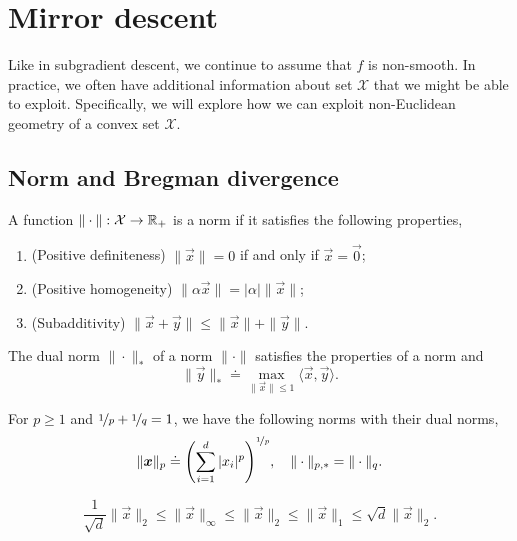 \section{Mirror descent}

Like in subgradient descent, we continue to assume that $f$ is non-smooth. In practice, we often
have additional information about set $\mathcal{X}$ that we might be able to exploit. Specifically,
we will explore how we can exploit non-Euclidean geometry of a convex set
$\mathcal{X}$.

\subsection{Norm and Bregman divergence}

\begin{definition}[Norm]
    A function $\| \cdot \|: \mathcal{X} \to \mathbb{R}_+$ is a norm if it satisfies the following properties,
    \begin{enumerate}
        \item (Positive definiteness) $\| \vec{x} \| = 0$ if and only if $\vec{x} = \vec{0}$;
        \item (Positive homogeneity) $\| \alpha \vec{x} \| = |\alpha| \| \vec{x} \|$;
        \item (Subadditivity) $\| \vec{x} + \vec{y} \| \leq \| \vec{x} \| + \| \vec{y} \|$.
    \end{enumerate}
\end{definition}

\begin{definition}
    The dual norm $\| \cdot \|_*$ of a norm $\| \cdot \|$ satisfies the properties of a norm and \[
        \| \vec{y} \|_* \doteq \max_{\| \vec{x} \| \leq 1} \langle \vec{x}, \vec{y} \rangle.
    \]
\end{definition}

\begin{lemma}
    For $p \geq 1$ and $\nicefrac{1}{p} + \nicefrac{1}{q} = 1$, we have the following norms with their dual norms, \[
        \| \vec{x} \|_p \doteq \lft( \sum_{i=1}^{d} |x_i|^p \rgt)^{\nicefrac{1}{p}}, \quad \| \cdot \|_{p,*} = \| \cdot \|_q.
    \]
\end{lemma}

\begin{lemma}
    \[
        \frac{1}{\sqrt{d}} \| \vec{x} \|_2 \leq \| \vec{x} \|_\infty \leq \| \vec{x} \|_2 \leq \| \vec{x} \|_1 \leq \sqrt{d} \| \vec{x} \|_2.
    \]
\end{lemma}

